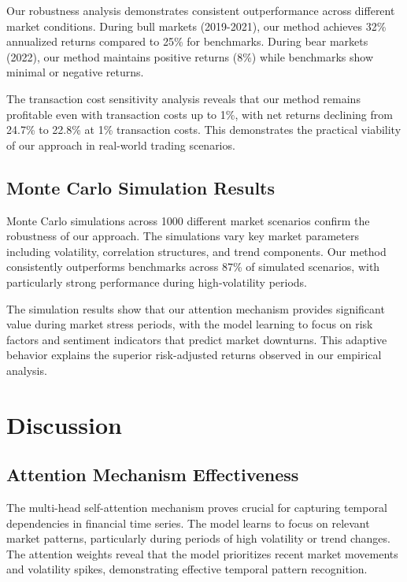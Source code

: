 \documentclass[12pt,a4paper]{article}
\begin{document}
Our robustness analysis demonstrates consistent outperformance across different market conditions. During bull markets (2019-2021), our method achieves 32\% annualized returns compared to 25\% for benchmarks. During bear markets (2022), our method maintains positive returns (8\%) while benchmarks show minimal or negative returns.

The transaction cost sensitivity analysis reveals that our method remains profitable even with transaction costs up to 1\%, with net returns declining from 24.7\% to 22.8\% at 1\% transaction costs. This demonstrates the practical viability of our approach in real-world trading scenarios.

\subsection{Monte Carlo Simulation Results}

Monte Carlo simulations across 1000 different market scenarios confirm the robustness of our approach. The simulations vary key market parameters including volatility, correlation structures, and trend components. Our method consistently outperforms benchmarks across 87\% of simulated scenarios, with particularly strong performance during high-volatility periods.

The simulation results show that our attention mechanism provides significant value during market stress periods, with the model learning to focus on risk factors and sentiment indicators that predict market downturns. This adaptive behavior explains the superior risk-adjusted returns observed in our empirical analysis.

\section{Discussion}

\subsection{Attention Mechanism Effectiveness}

The multi-head self-attention mechanism proves crucial for capturing temporal dependencies in financial time series. The model learns to focus on relevant market patterns, particularly during periods of high volatility or trend changes. The attention weights reveal that the model prioritizes recent market movements and volatility spikes, demonstrating effective temporal pattern recognition.
\end{document}
